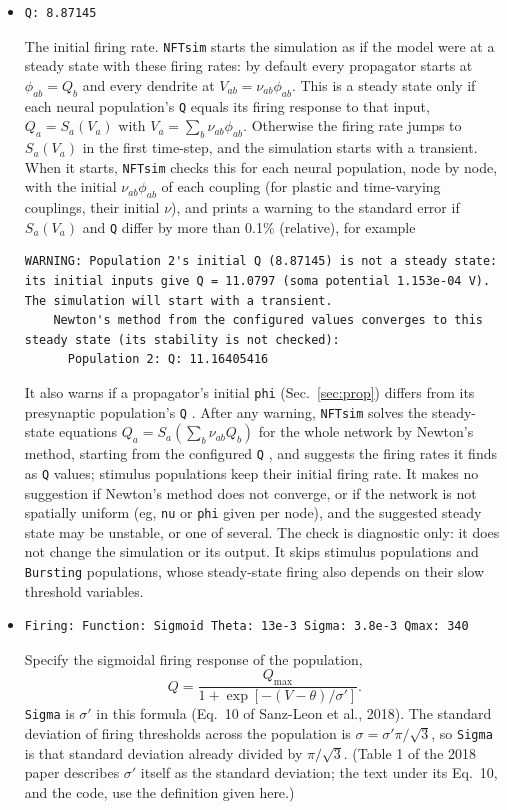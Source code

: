 \documentclass[12pt,a4paper]{article}
\newcommand{\type}[1]{{\small\small\tt #1} }
\newcommand{\NF}[0]{\type{NFTsim}}
\begin{document}
\begin{description}
\begin{itemize}
    The descriptor \type{Excitatory neurons} is not parsed by \NF, but it is strongly recommended for human referencing.
    \item
    \begin{lstlisting}
Q: 8.87145
    \end{lstlisting}
    The initial firing rate.
    \NF starts the simulation as if the model were at a steady state with these firing rates: by default every propagator starts at \(\phi_{ab}=Q_b\) and every dendrite at \(V_{ab}=\nu_{ab}\phi_{ab}\).
    This is a steady state only if each neural population's \type{Q} equals its firing response to that input, \(Q_a = S_a(V_a)\) with \(V_a=\sum_b \nu_{ab}\phi_{ab}\).
    Otherwise the firing rate jumps to \(S_a(V_a)\) in the first time-step, and the simulation starts with a transient.
    When it starts, \NF checks this for each neural population, node by node, with the initial \(\nu_{ab}\phi_{ab}\) of each coupling (for plastic and time-varying couplings, their initial \(\nu\)), and prints a warning to the standard error if \(S_a(V_a)\) and \type{Q} differ by more than 0.1\% (relative), for example
    \begin{lstlisting}
WARNING: Population 2's initial Q (8.87145) is not a steady state: its initial inputs give Q = 11.0797 (soma potential 1.153e-04 V). The simulation will start with a transient.
    Newton's method from the configured values converges to this steady state (its stability is not checked):
      Population 2: Q: 11.16405416
    \end{lstlisting}
    It also warns if a propagator's initial \type{phi} (Sec.~\ref{sec:prop}) differs from its presynaptic population's \type{Q}.
    After any warning, \NF solves the steady-state equations \(Q_a = S_a(\sum_b \nu_{ab} Q_b)\) for the whole network by Newton's method, starting from the configured \type{Q}, and suggests the firing rates it finds as \type{Q} values; stimulus populations keep their initial firing rate.
    It makes no suggestion if Newton's method does not converge, or if the network is not spatially uniform (eg, \type{nu} or \type{phi} given per node), and the suggested steady state may be unstable, or one of several.
    The check is diagnostic only: it does not change the simulation or its output.
    It skips stimulus populations and \type{Bursting} populations, whose steady-state firing also depends on their slow threshold variables.
    \item
    \begin{lstlisting}
Firing: Function: Sigmoid Theta: 13e-3 Sigma: 3.8e-3 Qmax: 340
    \end{lstlisting}
    Specify the sigmoidal firing response of the population,
    \[
        Q = \frac{Q_{\max}}{1+\exp[-(V-\theta)/\sigma']}.
    \]
    \type{Sigma} is \(\sigma'\) in this formula (Eq.~10 of Sanz-Leon et al., 2018).
    The standard deviation of firing thresholds across the population is \(\sigma = \sigma'\pi/\sqrt{3}\), so \type{Sigma} is that standard deviation already divided by \(\pi/\sqrt{3}\).
    (Table 1 of the 2018 paper describes \(\sigma'\) itself as the standard deviation; the text under its Eq.~10, and the code, use the definition given here.)


\end{itemize}
\end{description}
\end{document}
